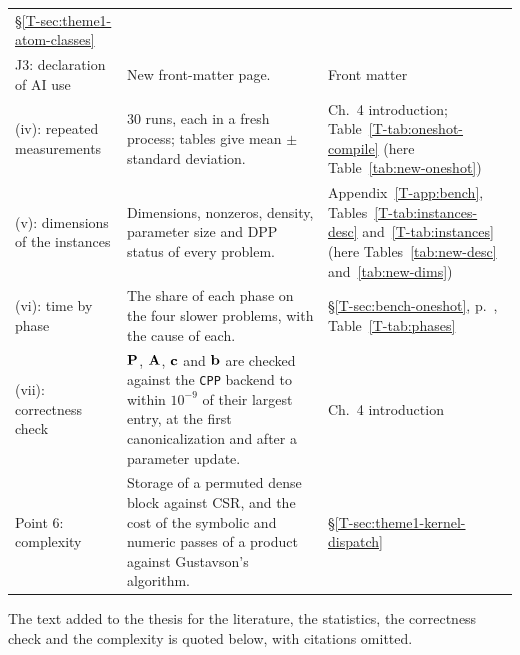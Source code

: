 \documentclass[letterpaper,12pt]{article}
\newcommand{\ac}[1]{#1}
\newcommand{\tsec}[1]{\S\ref{T-#1}}
\newcommand{\tpage}[1]{p.~\pageref{T-#1}}
\newcommand{\tref}[1]{\tsec{#1}, \tpage{#1}}
\begin{document}
{\begin{longtable}{>{\raggedright}p{} >{\raggedright}p{}
  >{\raggedright\arraybackslash}p{}}
    \tsec{sec:theme1-atom-classes} \\
J3: declaration of AI use
  & New front-matter page.
  & Front matter \\
(iv): repeated measurements
  & $30$ runs, each in a fresh process; tables give mean $\pm$ standard deviation.
  & Ch.~4 introduction; Table~\ref{T-tab:oneshot-compile} (here Table~\ref{tab:new-oneshot}) \\
(v): dimensions of the instances
  & Dimensions, nonzeros, density, parameter size and DPP status of every problem.
  & Appendix~\ref{T-app:bench}, Tables~\ref{T-tab:instances-desc} and~\ref{T-tab:instances}
    (here Tables~\ref{tab:new-desc} and~\ref{tab:new-dims}) \\
(vi): time by phase
  & The share of each phase on the four slower problems, with the cause of each.
  & \tref{sec:bench-oneshot}, Table~\ref{T-tab:phases} \\
(vii): correctness check
  & $\mathbf{P}$, $\mathbf{A}$, $\mathbf{c}$ and $\mathbf{b}$ are checked against the \texttt{CPP}
    backend to within $10^{-9}$ of their largest entry, at the first canonicalization and after
    a parameter update.
  & Ch.~4 introduction \\
Point 6: complexity
  & Storage of a permuted dense block against \ac{CSR}, and the cost of the symbolic and numeric
    passes of a product against Gustavson's algorithm.
  & \tsec{sec:theme1-kernel-dispatch} \\
\end{longtable}}

The text added to the thesis for the literature, the statistics, the correctness check and the
complexity is quoted below, with citations omitted.
\end{document}
